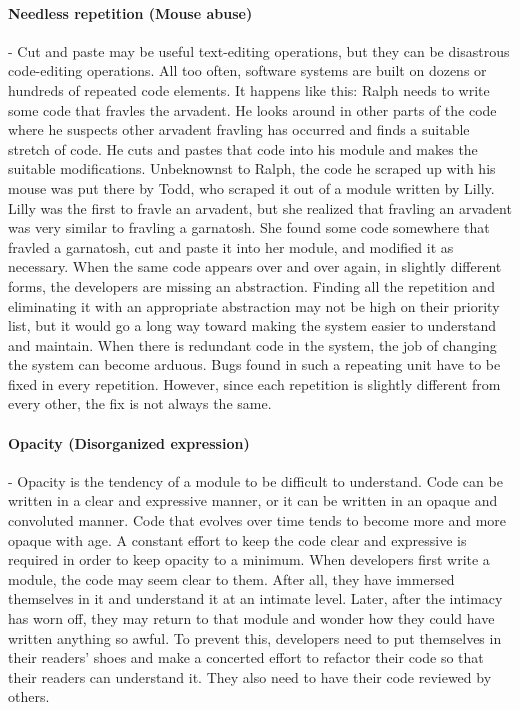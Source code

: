 \documentclass{llncs}
\begin{document}
\paragraph{Needless repetition (Mouse abuse)} - Cut and paste may be useful text-editing operations, but they can be disastrous code-editing operations. 
All too often, software systems are built on dozens or hundreds of repeated code elements. 
It happens like this: Ralph needs to write some code that fravles the arvadent.
He looks around in other parts of the code where he suspects other arvadent fravling has occurred and finds a suitable stretch of code.
He cuts and pastes that code into his module and makes the suitable modifications.
Unbeknownst to Ralph, the code he scraped up with his mouse was put there by Todd, who scraped it out of a module written by Lilly. 
Lilly was the first to fravle an arvadent, but she realized that fravling an arvadent was very similar to fravling a garnatosh. 
She found some code somewhere that fravled a garnatosh, cut and paste it into her module, and modified it as necessary.
When the same code appears over and over again, in slightly different forms, the developers are missing an abstraction.
Finding all the repetition and eliminating it with an appropriate abstraction may not be high on their priority list, but it would go a long way toward making the system easier to understand and maintain.
When there is redundant code in the system, the job of changing the system can become arduous.
Bugs found in such a repeating unit have to be fixed in every repetition.
However, since each repetition is slightly different from every other, the fix is not always the same.


\paragraph{Opacity (Disorganized expression)} - Opacity is the tendency of a module to be difficult to understand. 
Code can be written in a clear and expressive manner, or it can be written in an opaque and convoluted manner.
Code that evolves over time tends to become more and more opaque with age. 
A constant effort to keep the code clear and expressive is required in order to keep opacity to a minimum.
When developers first write a module, the code may seem clear to them.
After all, they have immersed themselves in it and understand it at an intimate level.
Later, after the intimacy has worn off, they may return to that module and wonder how they could have written anything so awful. 
To prevent this, developers need to put themselves in their readers' shoes and make a concerted effort to refactor their code so that their readers can understand it.
They also need to have their code reviewed by others.
\end{document}
